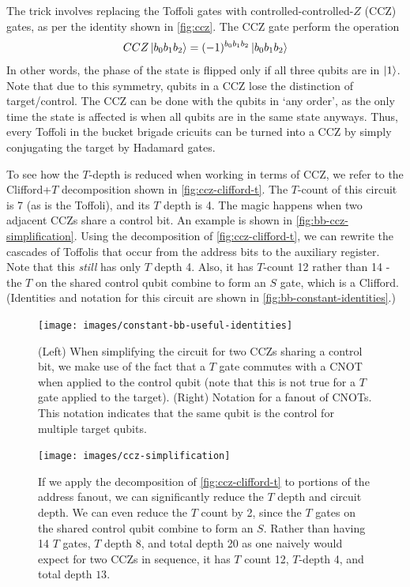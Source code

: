 \documentclass[a4paper,12pt]{article}
\begin{document}
The trick involves replacing the Toffoli gates with controlled-controlled-$Z$ (CCZ) gates, as per the identity shown in \autoref{fig:ccz}. The CCZ gate perform the operation
\begin{equation}
 CCZ \ket{b_0 b_1 b_2} = (-1)^{b_0 b_1 b_2} \ket{b_0 b_1 b_2}
\end{equation}
In other words, the phase of the state is flipped only if all three qubits are in $\ket{1}$. Note that due to this symmetry, qubits in a CCZ lose the distinction of target/control. 
The CCZ can be done with the qubits in `any order', as the only time the state is affected is when all qubits are in the same state anyways.
Thus, every Toffoli in the bucket brigade cricuits can be turned into a CCZ by simply conjugating the target by Hadamard gates. 


To see how the $T$-depth is reduced when working in terms of CCZ, we refer to the Clifford+$T$ decomposition shown in \autoref{fig:ccz-clifford-t}. 
The $T$-count of this circuit is 7 (as is the Toffoli), and its $T$ depth is 4. 
The magic happens when two adjacent CCZs share a control bit. 
An example is shown in \autoref{fig:bb-ccz-simplification}. 
Using the decomposition of \autoref{fig:ccz-clifford-t}, we can rewrite the cascades of Toffolis that occur from the address bits to the auxiliary register. 
Note that this \emph{still} has only $T$ depth 4.
Also, it has $T$-count 12 rather than 14 - the $T$ on the shared control qubit combine to form an $S$ gate, which is a Clifford. 
(Identities and notation for this circuit are shown in \autoref{fig:bb-constant-identities}.)

\begin{figure}[ht]
 \centering
  \captionsetup{width=.89\linewidth}
 \texttt{[image: images/constant-bb-useful-identities]}
 \caption{(Left) When simplifying the circuit for two CCZs sharing a control bit, we make use of the fact that a $T$ gate commutes with a CNOT when applied to the control qubit (note that this is not true for a $T$ gate applied to the target). 
 (Right) Notation for a fanout of CNOTs. This notation indicates that the same qubit is the control for multiple target qubits.}
 \label{fig:bb-constant-identities}
\end{figure}

\begin{figure}
 \centering
  \captionsetup{width=.89\linewidth}
 \texttt{[image: images/ccz-simplification]}
 \caption{If we apply the decomposition of \autoref{fig:ccz-clifford-t} to portions of the address fanout, we can significantly reduce the $T$ depth and circuit depth. 
 We can even reduce the $T$ count by 2, since the $T$ gates on the shared control qubit combine to form an $S$.
 Rather than having 14 $T$ gates, $T$ depth 8, and total depth 20 as one naively would expect for two CCZs in sequence, it has $T$ count 12, $T$-depth 4, and total depth $13$.}
 \label{fig:bb-ccz-simplification}
\end{figure}
\end{document}
